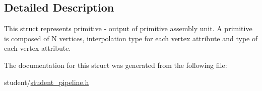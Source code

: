 \subsection{Detailed Description}
This struct represents primitive -\/ output of primitive assembly unit. A primitive is composed of N vertices, interpolation type for each vertex attribute and type of each vertex attribute. 

The documentation for this struct was generated from the following file\+:\begin{DoxyCompactItemize}
\item 
student/\hyperlink{student__pipeline_8h}{student\+\_\+pipeline.\+h}\end{DoxyCompactItemize}
